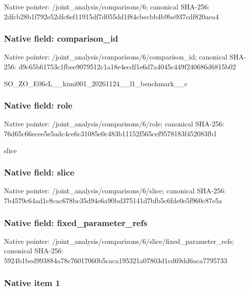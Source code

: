 \documentclass[10pt,a4paper]{article}
\begin{document}
Native pointer: /joint\_analysis/comparisons/6; canonical SHA-256: 2dfcb28b1f792e52dfc6ef11\allowbreak{}915df7d055dd1f84cbecbb4b\allowbreak{}9be937cdf820aea4



\subsubsection{Native field: comparison\_id}


Native pointer: /joint\_analysis/comparis\allowbreak{}ons/6/comparison\_id; canonical SHA-256: d9c65b61753c1fbee9079512\allowbreak{}c1a18e4ecdf1e6d7a4045c44\allowbreak{}9f240686d6815b02


SO\_ZO\_E06cL\_\_kimi001\_202\allowbreak{}61124\_\_l1\_benchmark\_\_c


\subsubsection{Native field: role}


Native pointer: /joint\_analysis/comparisons/6/role; canonical SHA-256: 76d65c66ecee5e5adc4ce6c3\allowbreak{}1085e0c483b11152f565cef9\allowbreak{}578183f452083fb1


slice


\subsubsection{Native field: slice}


Native pointer: /joint\_analysis/comparisons/6/slice; canonical SHA-256: 7b4579c64ad1c8cac678bc35\allowbreak{}d94e6a90bd375141d7bfb5c6\allowbreak{}fde0e5f960c87e5a



\subsubsection{Native field: fixed\_parameter\_refs}


Native pointer: /joint\_analysis/comparis\allowbreak{}ons/6/slice/fixed\_parame\allowbreak{}ter\_refs; canonical SHA-256: 5924b1bed993884a78c76017\allowbreak{}060b5caca195321a07803d1c\allowbreak{}d69dd6aca7795733



\subsubsection{Native item 1}
\end{document}
